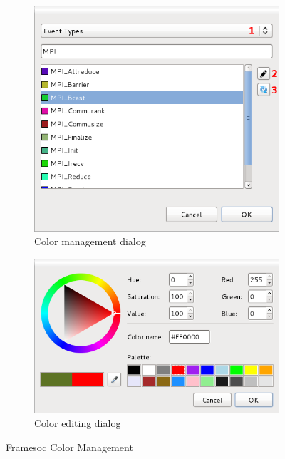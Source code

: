 \documentclass[twoside]{article}
\begin{document}
\begin{sloppypar}
\begin{figure}[h!]
  \centering
  \begin{subfigure}[c]{0.46\textwidth}
    \includegraphics[width=1.0\textwidth]{images/color_type_list_MPI.png}
    \caption{Color management dialog}
    \label{fig:color_type_list_MPI}
  \end{subfigure}%
  \hspace{30pt}
  \begin{subfigure}[c]{0.46\textwidth}
    \includegraphics[width=1.0\textwidth]{images/color_editing.png}
    \caption{Color editing dialog}
    \label{fig:color_editing}       
  \end{subfigure}%
  \caption{Framesoc Color Management}
  \label{fig:colors}       
 \end{figure}


\end{sloppypar}
\end{document}
